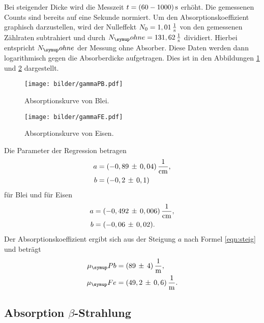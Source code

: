 Bei steigender Dicke wird die Messzeit $t=(60-1000)\,\si{\second}$ erhöht. Die gemessenen
Counts sind bereits auf eine Sekunde normiert.
Um den Absorptionskoeffizient graphisch darzustellen, wird der Nulleffekt $N_0=1,01\,\si[per-mode=fraction]{\per\second}$
von den gemessenen Zählraten subtrahiert und durch $N_\su{ohne}=131,62\,\si[per-mode=fraction]{\per\second}$
dividiert. Hierbei entspricht $N_\su{ohne}$ der Messung ohne Absorber.
Diese Daten werden dann logarithmisch gegen die Absorberdicke aufgetragen.
Dies ist in den Abbildungen \ref{fig:pb} und \ref{fig:fe} dargestellt.
\begin{figure}[H]
   \centering
   \texttt{[image: bilder/gammaPB.pdf]}
   \caption{Absorptionskurve von Blei.}
   \label{fig:pb}
\end{figure}
\begin{figure}[H]
   \centering
   \texttt{[image: bilder/gammaFE.pdf]}
   \caption{Absorptionskurve von Eisen.}
   \label{fig:fe}
\end{figure}
  
Die Parameter der Regression betragen
\begin{align*}
  a &= (-0,89\,\pm\,0,04)\,\si[per-mode=fraction]{\per\centi\meter}, \\
  b &= (-0,2\,\pm\,0,1)
\end{align*}
für Blei und für Eisen
\begin{align*}
  a &= (-0,492\,\pm\,0,006)\,\si[per-mode=fraction]{\per\centi\meter}, \\
  b &= (-0,06\,\pm\,0,02).
\end{align*}
Der Absorptionskoeffizient ergibt sich aus der Steigung $a$ nach Formel \eqref{eqn:steig}
und beträgt
\begin{align*}
  \mu_\su{Pb} &= (89\,\pm\,4)\,\si{\per\meter}, \\
  \mu_\su{Fe} &= (49,2\,\pm\,0,6)\,\si{\per\meter}.
\end{align*}
\subsection{Absorption \texorpdfstring{$\beta$}{beta}-Strahlung}

